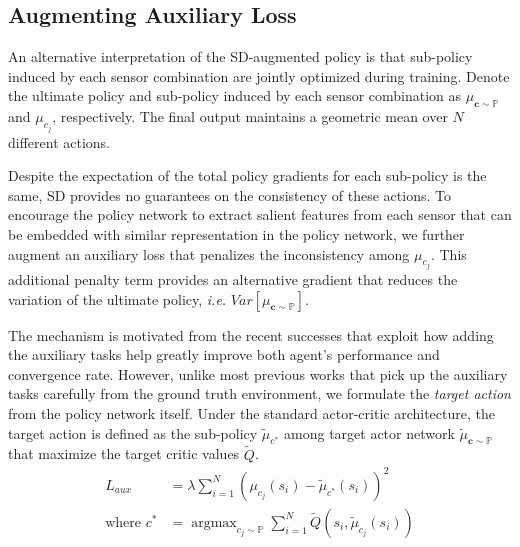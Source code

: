 \documentclass[../thesis.tex]{subfiles}
\begin{document}
\subsection{Augmenting Auxiliary Loss}
 
An alternative interpretation of the SD-augmented policy is that sub-policy induced by each sensor combination are jointly optimized during training. Denote the ultimate policy and sub-policy induced by each sensor combination as $\mu_{\mathbf{c}\sim \mathbb{P}}$ and $\mu_{c_j}$, respectively. The final output maintains a geometric mean over $N$ different actions.
 
Despite the expectation of the total policy gradients for each sub-policy is the same, SD provides no guarantees on the consistency of these actions.
To encourage the policy network to extract salient features from each sensor that can be embedded with similar representation in the policy network, we further augment an auxiliary loss that penalizes the inconsistency among $\mu_{c_j}$.
This additional penalty term provides an alternative gradient that reduces the variation of the ultimate policy, \textit{i.e.} $Var \left[ \mu_{\mathbf{c}\sim \mathbb{P}} \right]$.
 
The mechanism is motivated from the recent successes \cite{DBLP:journals/corr/GuLGTL16,mirowski2017a,lample2016playing,dosovitskiy2016learning} that exploit how adding the auxiliary tasks help greatly improve both agent's performance and convergence rate. However, unlike most previous works that pick up the auxiliary tasks carefully from the ground truth environment, we formulate the \textit{target action} from the policy network itself.
Under the standard actor-critic architecture, the target action is defined as the sub-policy $\tilde{\mu}_{c^{*}}$ among target actor network $\tilde{\mu}_{\mathbf{c}\sim \mathbb{P}}$ that maximize the target critic values $\tilde{Q}$.
\begin{align}
L_{aux} &= \lambda \sum_{i=1}^N (\mu_{c_j}(s_i)-\tilde{\mu}_{c^{*}}(s_i))^2 \\
\text{where  } c^{*} &= \mathop{\mathrm{argmax}}_{c_j \sim \mathbb{P}} \sum_{i=1}^N \tilde{Q}(s_i,\tilde{\mu}_{c_j}(s_i))
\end{align}
 
\end{document}

